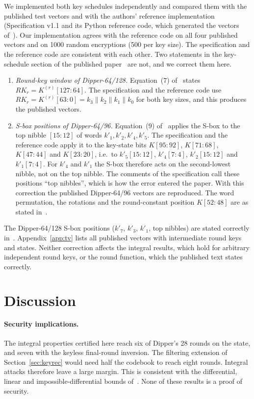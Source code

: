 \documentclass[pdflatex,sn-mathphys-num]{sn-jnl}
\theoremstyle{thmstyleone}
\theoremstyle{thmstylethree}
\theoremstyle{thmstyletwo}
\begin{document}
We implemented both key schedules independently and compared them with the published test vectors and with the authors' reference implementation (Specification v1.1 and its Python reference code, which generated the vectors of~\cite{dipper2026}). Our implementation agrees with the reference code on all four published vectors and on 1000 random encryptions (500 per key size). The specification and the reference code are consistent with each other. Two statements in the key-schedule section of the published paper~\cite{dipper2026} are not, and we correct them here.
\begin{enumerate}
\item \emph{Round-key window of Dipper-64/128.} Equation~(7) of~\cite{dipper2026} states $RK_r=K^{(r)}[127{:}64]$. The specification and the reference code use $RK_r=K^{(r)}[63{:}0]=k_3\|k_2\|k_1\|k_0$ for both key sizes, and this produces the published vectors.
\item \emph{S-box positions of Dipper-64/96.} Equation~(9) of~\cite{dipper2026} applies the S-box to the top nibble $[15{:}12]$ of words $k'_1,k'_2,k'_4,k'_5$. The specification and the reference code apply it to the key-state bits $K[95{:}92]$, $K[71{:}68]$, $K[47{:}44]$ and $K[23{:}20]$, i.e.\ to $k'_5[15{:}12]$, $k'_4[7{:}4]$, $k'_2[15{:}12]$ and $k'_1[7{:}4]$. For $k'_4$ and $k'_1$ the S-box therefore acts on the second-lowest nibble, not on the top nibble. The comments of the specification call these positions ``top nibbles'', which is how the error entered the paper. With this correction the published Dipper-64/96 vectors are reproduced. The word permutation, the rotations and the round-constant position $K[52{:}48]$ are as stated in~\cite{dipper2026}.
\end{enumerate}
The Dipper-64/128 S-box positions ($k'_7$, $k'_3$, $k'_1$, top nibbles) are stated correctly in~\cite{dipper2026}. Appendix~\ref{app:tv} lists all published vectors with intermediate round keys and states. Neither correction affects the integral results, which hold for arbitrary independent round keys, or the round function, which the published text states correctly.

\section{Discussion}\label{sec:discussion}

\paragraph{Security implications.} The integral properties certified here reach six of Dipper's 28 rounds on the state, and seven with the keyless final-round inversion. The filtering extension of Section~\ref{sec:keyrec} would need half the codebook to reach eight rounds. Integral attacks therefore leave a large margin. This is consistent with the differential, linear and impossible-differential bounds of~\cite{dipper2026}. None of these results is a proof of security.
\end{document}
